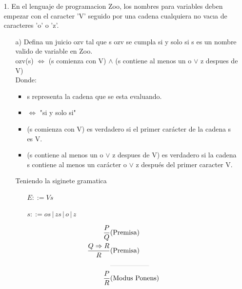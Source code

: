 \documentclass{article}
\begin{document}
    \begin{itemize}
        \item[1.] En el lenguaje de programacion Zoo, los nombres para variables deben empezar con el caracter ’V’ seguido por una cadena cualquiera no vacıa de caracteres ’o’ o ’z’.
            \begin{itemize}
                \item[a)]Defina un juicio ozv tal que s ozv se cumpla si y solo si s es un nombre valido de variable en Zoo.\\
                ozv(s) $\Leftrightarrow$ (s comienza con V) $\land$ (s contiene al menos un o $\lor$ z despues de V)\\
                Donde:\\
                \begin{itemize}
                    \item s representa la cadena que se esta evaluando.
                    \item $\Leftrightarrow$ "si y solo si"
                    \item (s comienza con V) es verdadero si el primer carácter de la cadena s es V.
                    \item (s contiene al menos un o $\lor$ z despues de V) es verdadero si la cadena s contiene al menos un carácter o $\lor$ z después del primer caracter V.
                \end{itemize}
                Teniendo la siginete gramatica
                \begin{center}
                    \begin{itemize}
                        \item[ ] $E ::= Vs$
                        \item[ ] $s ::= os \,|\, zs \,|\, o \,|\, z $  
                    \end{itemize}
                \end{center}

                \begin{align*}
                    \frac{P}{Q} & \text{(Premisa)} \\
                    \frac{Q \Rightarrow R}{R} & \text{(Premisa)}\\
                    &\rule{2cm}{0.1pt}&\\
                    \frac{P}{R}&\text{(Modus Ponens)}
                \end{align*}


\end{itemize}
\end{itemize}
\end{document}
